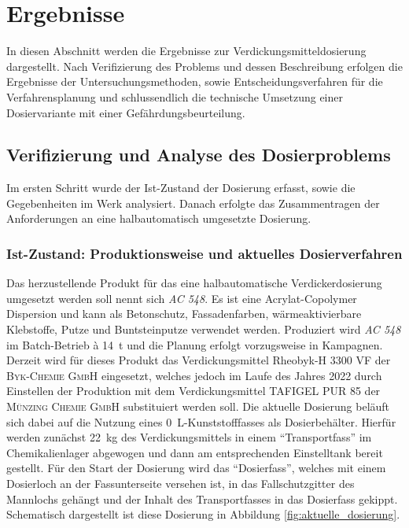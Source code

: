 \newpage
\section{Ergebnisse}
\label{sec:ergebnisse}

In diesen Abschnitt werden die Ergebnisse zur Verdickungsmitteldosierung dargestellt. Nach Verifizierung des Problems und dessen Beschreibung erfolgen die Ergebnisse der Untersuchungsmethoden, sowie Entscheidungsverfahren für die Verfahrensplanung und schlussendlich die technische Umsetzung einer Dosiervariante mit einer Gefährdungsbeurteilung.

\subsection{Verifizierung und Analyse des Dosierproblems}
\label{sec:verifizierung}
Im ersten Schritt wurde der Ist-Zustand der Dosierung erfasst, sowie die Gegebenheiten im Werk analysiert. Danach erfolgte das Zusammentragen der Anforderungen an eine halbautomatisch umgesetzte Dosierung.
 
\subsubsection{Ist-Zustand: Produktionsweise und aktuelles Dosierverfahren}
Das herzustellende Produkt für das eine halbautomatische Verdickerdosierung umgesetzt werden soll nennt sich \textit{AC 548}. Es ist eine Acrylat-Copolymer Dispersion und kann als Betonschutz, Fassadenfarben, wärmeaktivierbare Klebstoffe, Putze und Buntsteinputze verwendet werden. Produziert wird \textit{AC 548} im Batch-Betrieb à \SI{14}{\tonne} und die Planung erfolgt vorzugsweise in Kampagnen. \cite{ALBO.22.02.2022} \linebreak
Derzeit wird für dieses Produkt das Verdickungsmittel Rheobyk-H 3300 VF der \textsc{Byk-Chemie GmbH} eingesetzt, welches jedoch im Laufe des Jahres 2022 durch Einstellen der Produktion mit dem Verdickungsmittel TAFIGEL PUR 85 der \textsc{Münzing Chemie GmbH} substituiert werden soll. Die aktuelle Dosierung beläuft sich dabei auf die Nutzung eines \SI{0}{\liter}-Kunststofffasses als Dosierbehälter. Hierfür werden zunächst \SI{22}{\kilo \gram} des Verdickungsmittels in einem "`Transportfass"' im Chemikalienlager abgewogen und dann am entsprechenden Einstelltank bereit gestellt. Für den Start der Dosierung wird das "`Dosierfass"', welches mit einem Dosierloch an der Fassunterseite versehen ist, in das Fallschutzgitter des Mannlochs gehängt und der Inhalt des Transportfasses in das Dosierfass gekippt. Schematisch dargestellt ist diese Dosierung in Abbildung \ref{fig:aktuelle_dosierung}.

